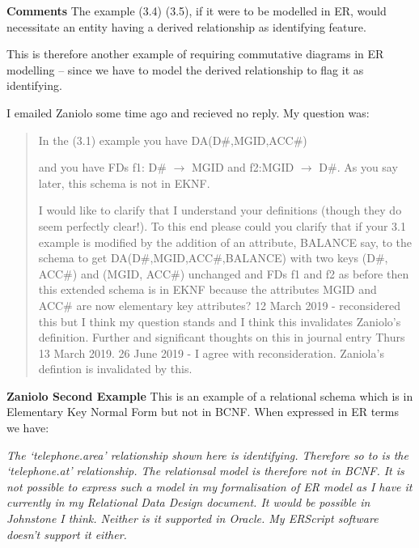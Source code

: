 \documentclass[10pt,a4paper]{scrartcl}
\renewcommand{\erpictureFolder}[0]{../SharedPictures}
\begin{document}
\textbf{Comments}
The example (3.4) (3.5), if it were to be modelled in ER, would necessitate an entity having a derived relationship as identifying feature.

This is therefore another example of requiring commutative diagrams in ER modelling -- since we have to model the derived relationship
to flag it as identifying.

I emailed Zaniolo some time ago and recieved no reply. My question was:
\begin{quote}
In the (3.1) example you have DA(D\#,MGID,ACC\#)  

and you have FDs f1: D\# $\rightarrow$ MGID and f2:MGID $\rightarrow$ D\#. As you say later, this schema is not in EKNF. 

I would like to clarify that I understand your definitions (though they do seem perfectly clear!). 
To this end please could you clarify that if your 3.1 example is modified by the addition of an attribute,
BALANCE say, to the schema to get DA(D\#,MGID,ACC\#,BALANCE) 
with two keys (D\#, ACC\#) and  (MGID, ACC\#) unchanged and FDs f1 and f2 
as before then this extended schema is in EKNF because 
the attributes MGID and ACC\# are now elementary key attributes? 
{\color{red} 12 March 2019 - reconsidered this but I think my question stands and I think this invalidates Zaniolo's definition. Further and significant thoughts on this in journal entry Thurs 13 March 2019. }
{\color{blue} 26 June 2019 - I agree with reconsideration. Zaniola's defintion is invalidated by this.}
\end{quote}

\begin{center}

\end{center}


\textbf{Zaniolo Second Example}
This is an example of a relational schema which is in Elementary Key Normal Form but not in BCNF. When expressed in ER terms we have:
\begin{center}

\end{center}
\textit{The `telephone.area' relationship shown here is identifying. Therefore so to is the `telephone.at' relationship.
The relationsal model is therefore not in BCNF. It is not possible to express such a  model in my formalisation of ER model as I  have it currently in my Relational Data Design document. It would be possible in Johnstone I think. Neither is it supported in Oracle. My ERScript software doesn't support it either.} 
\end{document}
